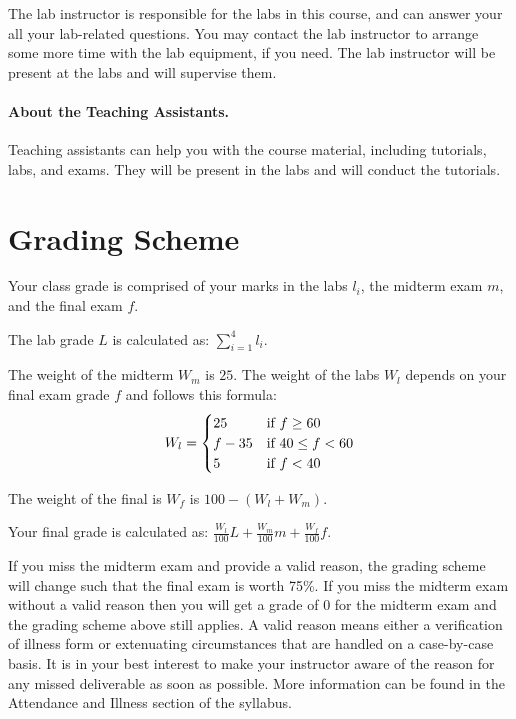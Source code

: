 \documentclass[letterpaper,10pt]{article}
\begin{document}
The lab instructor is responsible for the labs in this course, and can answer your all your lab-related questions. You may contact the lab instructor to arrange some more time with the lab equipment, if you need. The lab instructor will be present at the labs and will supervise them.

\paragraph{About the Teaching Assistants.}

Teaching assistants can help you with the course material, including tutorials, labs, and exams. They will be present in the labs and will conduct the tutorials.

\section*{Grading Scheme}

Your class grade is comprised of your marks in the labs $l_{i}$, the midterm exam $m$, and the final exam $f$.

The lab grade $L$ is calculated as: $\sum_{i=1}^{4}l_{i}$.

The weight of the midterm $W_{m}$ is $25$. The weight of the labs $W_{l}$ depends on your final exam grade $f$ and follows this formula:
\[
 W_{l} = \begin{cases}
        25      & $if~$ f \ge 60\\
        f - 35  & $if~$ 40 \le f < 60\\
        5       & $if~$ f < 40
        \end{cases}
\]

The weight of the final is $W_{f}$ is $100 - (W_{l} + W_{m})$.

Your final grade is calculated as: $\frac{W_{l}}{100}L + \frac{W_{m}}{100}m + \frac{W_{f}}{100}f $.

If you miss the midterm exam and provide a valid reason, the grading scheme will change such that the final exam is worth 75\%. If you miss the midterm exam without a valid reason then you will get a grade of 0 for the midterm exam and the grading scheme above still applies. A valid reason means either a verification of illness form or extenuating circumstances that are handled on a case-by-case basis. It is in your best interest to make your instructor aware of the reason for any missed deliverable as soon as possible. More information can be found in the Attendance and Illness section of the syllabus.
\end{document}
